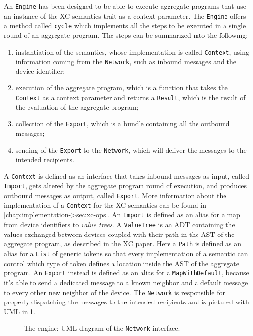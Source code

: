 An \texttt{Engine} has been designed to be able to execute aggregate programs that use an instance of the \ac{XC} semantics trait as a context parameter.
%
The \texttt{Engine} offers a method called \texttt{cycle} which implements all the steps to be executed in a single round of an aggregate program.
%
The steps can be summarized into the following:
\begin{enumerate}
    \item instantiation of the semantics, whose implementation is called \texttt{Context}, using information coming from the \texttt{Network}, such as inbound messages and the device identifier;
    \item execution of the aggregate program, which is a function that takes the \texttt{Context} as a context parameter and returns a \texttt{Result}, which is the result of the evaluation of the aggregate program;
    \item collection of the \texttt{Export}, which is a bundle containing all the outbound messages;
    \item sending of the \texttt{Export} to the \texttt{Network}, which will deliver the messages to the intended recipients.
\end{enumerate}
%
A \texttt{Context} is defined as an interface that takes inbound messages as input, called \texttt{Import}, gets altered by the aggregate program round of execution, and produces outbound messages as output, called \texttt{Export}.
%
More information about the implementation of a \texttt{Context} for the \ac{XC} semantics can be found in \cref{chap:implementation->sec:xc-ops}.
%
An \texttt{Import} is defined as an alias for a map from device identifiers to \textit{value trees}.
%
A \texttt{ValueTree} is an \ac{ADT} containing the values exchanged between devices coupled with their path in the \ac{AST} of the aggregate program, as described in the \ac{XC} paper\cite{xc}.
%
Here a \texttt{Path} is defined as an alias for a \texttt{List} of generic tokens so that every implementation of a semantic can control which type of token defines a location inside the \ac{AST} of the aggregate program.
%
An \texttt{Export} instead is defined as an alias for a \texttt{MapWithDefault}, because it's able to send a dedicated message to a known neighbor and a default message to every other new neighbor of the device.
%
The \texttt{Network} is responsible for properly dispatching the messages to the intended recipients and is pictured with \ac{UML} in \cref{fig:engine-network-diagram}.

\begin{figure}
    \centering
    \caption{The engine: \ac{UML} diagram of the \texttt{Network} interface.}
    \label{fig:engine-network-diagram}
    \bigskip
    \resizebox{\linewidth}{!}{
        
    }
\end{figure}

